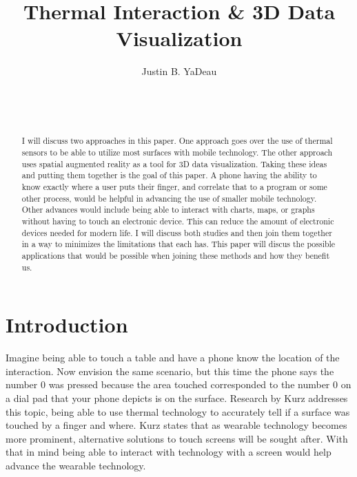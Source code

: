 \documentclass{sig-alternate}
\begin{document}

\title{Thermal Interaction \& 3D Data Visualization}


\author{
\alignauthor
Justin B. YaDeau\\
	\\
	\\
	\\
}

\maketitle

\begin{abstract}
I will discuss two approaches in this paper. One approach goes over the use of thermal sensors to be able to utilize most surfaces with mobile technology. The other approach uses spatial augmented reality as a tool for 3D data visualization. Taking these ideas and putting them together is the goal of this paper. A phone having the ability to know exactly where a user puts their finger, and correlate that to a program or some other process, would be helpful in advancing the use of smaller mobile technology. Other advances would include being able to interact with charts, maps, or graphs without having to touch an electronic device. This can reduce the amount of electronic devices needed for modern life. I will discuss both studies and then join them together in a way to minimizes the limitations that each has. This paper will discus the possible applications that would be possible when joining these methods and how they benefit us.
\end{abstract}


\section{Introduction}
\label{sec:Introduction}
Imagine being able to touch a table and have a phone know the location of the interaction. Now envision the same scenario, but this time the phone says the number 0 was pressed because the area touched corresponded to the number 0 on a dial pad that your phone depicts is on the surface. Research by Kurz \cite{Thermal} addresses this topic, being able to use thermal technology to accurately tell if a surface was touched by a finger and where. Kurz \cite{Thermal} states that as wearable technology becomes more prominent, alternative solutions to touch screens will be sought after. With that in mind being able to interact with technology with a screen would help advance the wearable technology.    
\end{document}
